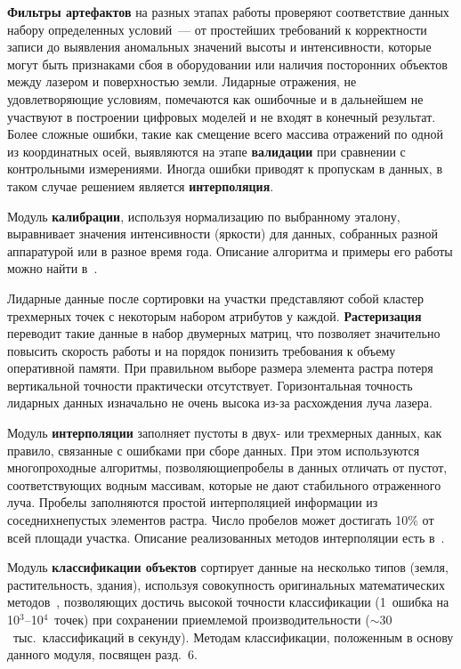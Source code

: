 \begin{multicols}{2}
   \textbf{Фильтры артефактов} на разных этапах работы проверяют 
соответствие данных набору определенных условий~--- от простейших 
требований к корректности записи до выявления аномальных значений высоты 
и интенсивности, которые могут быть признаками сбоя в оборудовании или 
наличия посторонних объектов между лазером и поверхностью земли. 
Лидарные отражения, не удовлетворяющие условиям, помечаются как 
ошибочные и в дальнейшем не участвуют в построении цифровых моделей и не 
входят в конечный результат. Более сложные ошибки, такие как смещение 
всего массива отражений по одной из координатных осей, выявляются на этапе 
\textbf{валидации} при сравнении с контрольными измерениями. Иногда 
ошибки приводят к пропускам в данных, в таком случае решением является 
\textbf{интерполяция}.
   
   Модуль \textbf{калибрации}, используя нормализацию по выбранному 
эталону, выравнивает значения интенсивности (яркости) для данных, 
собранных разной аппаратурой или в разное время года. Описание алгоритма и 
примеры его работы можно найти в~\cite{5su}.
   
   Лидарные данные после сортировки на участки представляют собой кластер 
трехмерных точек с некоторым набором атрибутов у каждой. 
\textbf{Растеризация} переводит такие данные в набор двумерных матриц, что 
позволяет значительно повысить скорость работы и на порядок понизить 
требования к объему оперативной памяти. При правильном выборе размера 
элемента растра потеря вертикальной точности практически отсутствует. 
Горизонтальная точность лидарных данных изначально не очень высока из-за 
расхождения луча лазера.
   
   Модуль \textbf{интерполяции} заполняет пустоты в двух- или трехмерных данных, 
как правило, связанные с ошибками при сборе данных. При этом используются 
многопроходные алгоритмы, позволяющие\linebreak пробелы в данных отличать от 
пустот, со\-от\-вет\-ст\-ву\-ющих водным массивам, которые не дают стабильного 
отраженного луча. Пробелы заполняются прос\-той интерполяцией информации 
из соседних\linebreak непустых элементов растра. Число пробелов может достигать 10\% 
от всей площади участка. Описание реализованных методов интерполяции есть 
в~\cite{5su}.
   
   Модуль \textbf{классификации объектов} сортирует данные на несколько 
типов (земля, растительность, здания), используя совокупность оригинальных 
математических методов~\cite{6su, 7su}, позволяющих достичь высокой 
точности классификации (1~ошибка на 10$^3$--10$^4$~точек) при сохранении 
приемлемой производительности ($\sim 30$~тыс.\ классификаций в секунду). 
Методам классификации, положенным в основу данного модуля, посвящен 
разд.~6.
   

\end{multicols}
